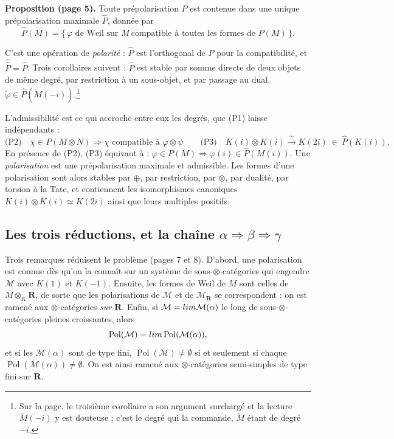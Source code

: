 \documentclass[11pt,a4paper]{article}
\begin{document}
\textbf{Proposition (page 5).} Toute prépolarisation $P$ est contenue dans une
unique prépolarisation maximale $\widehat{P}$, donnée par
\[
\widehat{P}(M) = \{\,\varphi \text{ de Weil sur } M \ \text{compatible à
toutes les formes de } P(M)\,\} .
\]

C'est une opération de \emph{polarité} : $\widehat{P}$ est l'orthogonal de $P$
pour la compatibilité, et $\widehat{\widehat{P}} = \widehat{P}$. Trois
corollaires suivent : $\widehat{P}$ est stable par somme directe de deux
objets de même degré, par restriction à un sous-objet, et par passage au dual,
$\check{\varphi} \in \widehat{P}(\check{M}(-i))$.\footnote{Sur la page, le
troisième corollaire a son argument surchargé et la lecture $\check{M}(-i)$ y
est douteuse ; c'est le degré qui la commande, $\check{M}$ étant de degré
$-i$.}

L'admissibilité est ce qui accroche entre eux les degrés, que (P1) laisse
indépendants :
\[
\text{(P2)}\quad \chi \in P(M \otimes N) \Longrightarrow
\chi \text{ compatible à } \varphi \otimes \psi
\qquad
\text{(P3)}\quad K(i) \otimes K(i) \xrightarrow{\ \sim\ } K(2i)
\ \in\ \widehat{P}(K(i)) .
\]
En présence de (P2), (P3) équivaut à : $\varphi \in P(M) \Rightarrow
\varphi(i) \in \widehat{P}(M(i))$. Une \emph{polarisation} est une
prépolarisation maximale et admissible. Les formes d'une polarisation sont
alors stables par $\oplus$, par restriction, par $\otimes$, par dualité, par
torsion à la Tate, et contiennent les isomorphismes canoniques $K(i) \otimes
K(i) \simeq K(2i)$ ainsi que leurs multiples positifs.

\subsection*{Les trois réductions, et la chaîne $\alpha \Rightarrow \beta
\Rightarrow \gamma$}

Trois remarques réduisent le problème (pages 7 et 8). D'abord, une polarisation
est connue dès qu'on la connaît sur un système de sous-$\otimes$-catégories qui
engendre $\mathcal{M}$ avec $K(1)$ et $K(-1)$. Ensuite, les formes de Weil de
$M$ sont celles de $M \otimes_{K} \mathbf{R}$, de sorte que les polarisations
de $\mathcal{M}$ et de $\mathcal{M}_{\mathbf{R}}$ se correspondent : on est
ramené aux $\otimes$-catégories \emph{sur $\mathbf{R}$}. Enfin, si
$\mathcal{M} = \varinjlim \mathcal{M}(\alpha)$ le long de
sous-$\otimes$-catégories pleines croissantes, alors
\[
\operatorname{Pol}(\mathcal{M}) = \varprojlim \operatorname{Pol}(\mathcal{M}(\alpha)) ,
\]
et si les $\mathcal{M}(\alpha)$ sont de type fini,
$\operatorname{Pol}(\mathcal{M}) \neq \emptyset$ si et seulement si chaque
$\operatorname{Pol}(\mathcal{M}(\alpha)) \neq \emptyset$. On est ainsi ramené
aux $\otimes$-catégories semi-simples de type fini sur $\mathbf{R}$.
\end{document}
